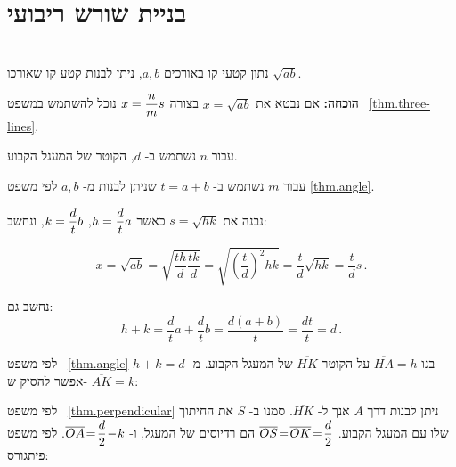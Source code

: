 


\section{%
בניית שורש ריבועי%
}\label{s.root}

\begin{theorem}\label{thm.root}\mbox{}\\
נתון קטעי קו באורכים
$a,b$,
ניתן לבנות קטע קו שאורכו
$\sqrt{ab}$.
\end{theorem}

\textbf{הוכחה:}
אם נבטא את
$x=\sqrt{ab}$
בצורה
$x=\displaystyle\frac{n}{m}s$
נוכל להשתמש במשפט~%
\ref{thm.three-lines}.

עבור
$n$
נשתמש ב-%
$d$,
הקוטר של המעגל הקבוע.

עבור
$m$
נשתמש ב-%
$t=a+b$
שניתן לבנות מ-%
$a,b$
לפי משפט
\ref{thm.angle}.

נבנה את
$s=\sqrt{hk}$
כאשר
$h=\displaystyle\frac{d}{t}a$, $k=\displaystyle\frac{d}{t}b$,
ונחשב:
%

\[
x=\sqrt{ab}=\sqrt{\frac{th}{d}\frac{tk}{d}}=\sqrt{\left(\frac{t}{d}\right)^2hk}=\frac{t}{d}\sqrt{hk}=\frac{t}{d}s\,.
\]
%

נחשב גם: 
\[
h+k = \frac{d}{t}a + \frac{d}{t}b = \frac{d(a+b)}{t} = \frac{dt}{t} = d\,.
\]


לפי משפט~%
\ref{thm.angle}
בנו
$\overline{HA}= h$
על הקוטר
$\overline{HK}$
של המעגל הקבוע. מ-%
$h+k=d$
אפשר להסיק ש-%
$\overline{AK}=k$:
\begin{center}

\vspace*{-4pt}
\end{center}
לפי משפט~%
\ref{thm.perpendicular}
ניתן לבנות דרך
$A$
אנך ל-%
$\overline{HK}$.
סמנו ב-%
$S$
את החיתוך שלו עם המעגל הקבוע.
$\overline{OS}\!=\!\overline{OK}\!=\!\displaystyle\frac{d}{2}$
הם רדיוסים של המעגל, ו-%
$\overline{OA}\!=\!\displaystyle\frac{d}{2}\!-\!k$.
לפי משפט פיתגורס:

